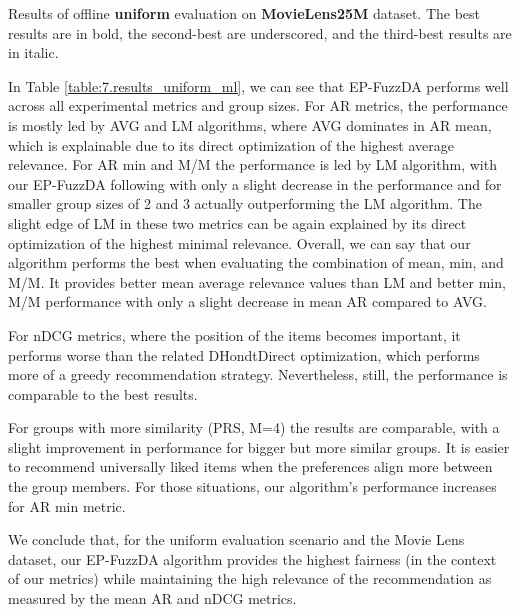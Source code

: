 \begin{table}[!htbp]
    \centering
    \scalebox{0.76}{\hspace*{-1.2cm}{
        
    }}\hspace*{-1.3cm}
    \caption[Results of offline uniform evaluation on Movie Lens dataset]{Results of offline \textbf{uniform} evaluation on \textbf{MovieLens25M} dataset. The best results are in bold, the second-best are underscored, and the third-best results are in italic.}
    \label{table:7.results_uniform_ml}
\end{table}


In Table \ref{table:7.results_uniform_ml}, we can see that EP-FuzzDA performs well across all experimental metrics and group sizes. For AR metrics, the performance is mostly led by AVG and LM algorithms, where AVG dominates in AR mean, which is explainable due to its direct optimization of the highest average relevance. For AR min and M/M the performance is led by LM algorithm, with our EP-FuzzDA following with only a slight decrease in the performance and for smaller group sizes of 2 and 3 actually outperforming the LM algorithm. The slight edge of LM in these two metrics can be again explained by its direct optimization of the highest minimal relevance. Overall, we can say that our algorithm performs the best when evaluating the combination of mean, min, and M/M. It provides better mean average relevance values than LM and better min, M/M performance with only a slight decrease in mean AR compared to AVG.

For nDCG metrics, where the position of the items becomes important, it performs worse than the related DHondtDirect optimization, which performs more of a greedy recommendation strategy. Nevertheless, still, the performance is comparable to the best results.

For groups with more similarity (PRS, M=4) the results are comparable, with a slight improvement in performance for bigger but more similar groups. It is easier to recommend universally liked items when the preferences align more between the group members. For those situations, our algorithm's performance increases for AR min metric.

We conclude that, for the uniform evaluation scenario and the Movie Lens dataset, our EP-FuzzDA algorithm provides the highest fairness (in the context of our metrics) while maintaining the high relevance of the recommendation as measured by the mean AR and nDCG metrics.

